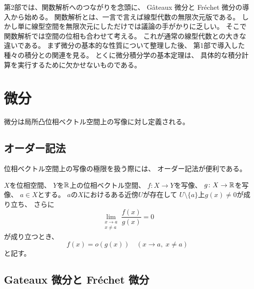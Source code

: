 \documentclass[report]{jlreq}
\begin{document}
第2部では、関数解析へのつながりを念頭に、
G\^ateaux 微分と Fr\'echet 微分の導入から始める。
関数解析とは、一言で言えば線型代数の無限次元版である\cite{河東_1522262179753645952}。
しかし単に線型空間を無限次元にしただけでは議論の手がかりに乏しい。
そこで関数解析では空間の位相も合わせて考える。
これが通常の線型代数との大きな違いである。
まず微分の基本的な性質について整理した後、
第1部で導入した種々の積分との関連を見る。
とくに微分積分学の基本定理は、
具体的な積分計算を実行するために欠かせないものである。

%
\chapter{微分}

微分は局所凸位相ベクトル空間上の写像に対し定義される。

%
\section{オーダー記法}

位相ベクトル空間上の写像の極限を扱う際には、
オーダー記法が便利である。

\begin{definition}[オーダー記法]
    $X$を位相空間、
    $Y$を$\mathbb{R}$上の位相ベクトル空間、
    $f \colon X \to Y$を写像、
    $g \colon X \to \mathbb{R}$を写像、
    $a \in X$とする。
    $a$の$X$におけるある近傍$U$が存在して
    $U \setminus \{a\}$上$g(x) \neq 0$が成り立ち、
    さらに
    \begin{equation}
        \lim_{\substack{x \to a \\ x \neq a}} \frac{f(x)}{g(x)} = 0
    \end{equation}
    が成り立つとき、
    \begin{equation}
        f(x) = o(g(x)) \quad (x \to a, \; x \neq a)
    \end{equation}
    と記す。
\end{definition}



%
\section{Gateaux 微分と Fr\'echet 微分}
\end{document}
